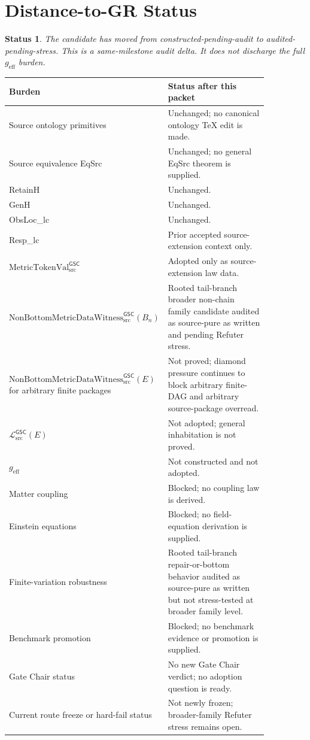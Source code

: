 \documentclass[11pt]{article}
\newcommand{\MetricTokenVal}{\mathrm{MetricTokenVal}_{\mathrm{src}}^{\mathsf{GSC}}}
\newcommand{\Witness}{\mathrm{NonBottomMetricDataWitness}_{\mathrm{src}}^{\mathsf{GSC}}}
\newcommand{\MetricData}{\mathcal{L}_{\mathrm{src}}^{\mathsf{GSC}}}
\newcommand{\geff}{g_{\mathrm{eff}}}
\newcommand{\Bn}{B_n}
\newtheorem{status}{Status}
\begin{document}
\section{Distance-to-GR Status}

\begin{status}
The candidate has moved from constructed-pending-audit to
audited-pending-stress. This is a same-milestone audit delta. It does not
discharge the full \(\geff\) burden.
\end{status}

\begin{longtable}{p{0.30\linewidth}p{0.56\linewidth}}
\toprule
Burden & Status after this packet \\
\midrule
Source ontology primitives & Unchanged; no canonical ontology TeX edit is made. \\
Source equivalence EqSrc & Unchanged; no general EqSrc theorem is supplied. \\
RetainH & Unchanged. \\
GenH & Unchanged. \\
ObsLoc\_lc & Unchanged. \\
Resp\_lc & Prior accepted source-extension context only. \\
\(\MetricTokenVal\) & Adopted only as source-extension law data. \\
\(\Witness(\Bn)\) & Rooted tail-branch broader non-chain family candidate
audited as source-pure as written and pending Refuter stress. \\
\(\Witness(E)\) for arbitrary finite packages & Not proved; diamond pressure
continues to block arbitrary finite-DAG and arbitrary source-package overread. \\
\(\MetricData(E)\) & Not adopted; general inhabitation is not proved. \\
\(\geff\) & Not constructed and not adopted. \\
Matter coupling & Blocked; no coupling law is derived. \\
Einstein equations & Blocked; no field-equation derivation is supplied. \\
Finite-variation robustness & Rooted tail-branch repair-or-bottom behavior
audited as source-pure as written but not stress-tested at broader family
level. \\
Benchmark promotion & Blocked; no benchmark evidence or promotion is supplied. \\
Gate Chair status & No new Gate Chair verdict; no adoption question is ready. \\
Current route freeze or hard-fail status & Not newly frozen; broader-family
Refuter stress remains open. \\
\bottomrule
\end{longtable}
\end{document}

